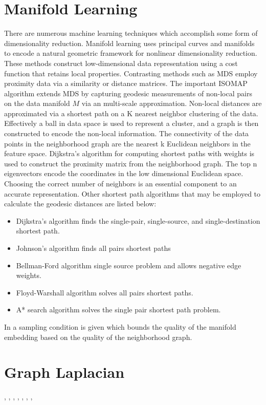 \section*{Manifold Learning}
There are numerous machine learning techniques which accomplish some form of dimensionality reduction.
Manifold learning uses principal curves and manifolds to encode a natural geometric framework for nonlinear dimensionality reduction.  These methods construct low-dimensional data representation using a cost function that retains local properties.
Contrasting methods such as MDS employ proximity data via a similarity or distance matrices.  The important ISOMAP \cite{MDS_ISOMAP}algorithm extends MDS by capturing geodesic measurements of non-local pairs on the data manifold $M$ via an multi-scale approximation.  Non-local distances are approximated via a shortest path on a K nearest neighbor clustering of the data.  Effectively a ball in data space is used to represent a cluster, and a graph is then constructed to encode the non-local information.  The connectivity of the data points in the neighborhood graph are the nearest k Euclidean neighbors in the feature space.  Dijkstra's algorithm for computing shortest paths with weights is used to construct the proximity matrix from the neighborhood graph.  The top n eigenvectors encode the coordinates in the low dimensional Euclidean space.  Choosing the correct number of neighbors is an essential component to an accurate representation.
Other shortest path algorithms that may be employed to calculate the geodesic distances are listed below:
\begin{itemize}
  \item Dijkstra's algorithm finds the single-pair, single-source, and single-destination shortest path.
  \item Johnson's algorithm finds all pairs shortest paths
  \item Bellman-Ford algorithm single source problem and allows negative edge weights.
  \item Floyd-Warshall algorithm solves all pairs shortest paths.
  \item A* search algorithm solves the single pair shortest path problem.
\end{itemize}
In \cite{MDSBernstein00graphapproximations} a sampling condition is given which bounds the quality of the manifold embedding based on the quality of the neighborhood graph.


\section*{Graph Laplacian}
\cite{GLPBoydconvexoptimization}, \cite{GLPChung93laplaciansof}, \cite{GLPCrescenzi96toweight},
\cite{GLPGuatterygraphembeddings}, \cite{GLPBoydconvexoptimization},
\cite{GLPChung93laplaciansof},
\cite{GLPSpectralAnalysisComplexLaplacianMatrices}, \cite{GLPKellersignedgraph}

